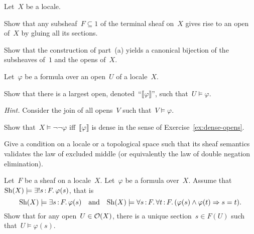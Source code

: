\documentclass{ws-rv9x6}
\begin{document}
{\begin{exercise}%
\label{ex:subsheaves-1}%
Let~$X$ be a locale.
\begin{alphlist}[(b)]
\item Show that any subsheaf~$F \subseteq 1$ of the terminal sheaf on~$X$ gives rise
to an open of~$X$ by gluing all its sections.
\item Show that the construction of part~(a) yields a canonical bijection of
the subsheaves of~$1$ and the opens of~$X$.
\end{alphlist}
\end{exercise}

\begin{exercise}%
\label{ex:negneg-interpretation}%
Let~$\varphi$ be a formula over an open~$U$ of a locale~$X$.
\begin{alphlist}[(c)]
\item Show that there is a largest open,
denoted~``$\llbracket\varphi\rrbracket$'', such that~$U \models \varphi$.\smallskip

{\scriptsize\emph{Hint.} Consider the join of all opens~$V$ such that~$V
\models \varphi$.\par}

\item Show that~$X \models \neg\neg\varphi$ iff~$\llbracket\varphi\rrbracket$
is dense in the sense of Exercise~\ref{ex:dense-opens}.

\item Give a condition on a locale or a topological space such that its sheaf
semantics validates the law of excluded middle (or equivalently the law of
double negation elimination).
\end{alphlist}
\end{exercise}

\begin{exercise}%
\label{ex:global-existence}%
Let~$F$ be a sheaf on a locale~$X$. Let~$\varphi$ be a formula over~$X$. Assume
that~$\mathrm{Sh}(X) \models \exists!s\,{:}\,F\mathpunct{.} \varphi(s)$, that is
\[ \mathrm{Sh}(X) \models \exists s\,{:}\,F\mathpunct{.} \varphi(s) \quad\text{and}\quad
  \mathrm{Sh}(X) \models \forall s\,{:}\,F\mathpunct{.} \forall t\,{:}\,F\mathpunct{.} (\varphi(s) \wedge \varphi(t)
  \Rightarrow s = t). \]
Show that for any open~$U \in \mathcal{O}(X)$, there is a unique section~$s \in F(U)$
such that~$U \models \varphi(s)$.
\end{exercise}

}
\end{document}
